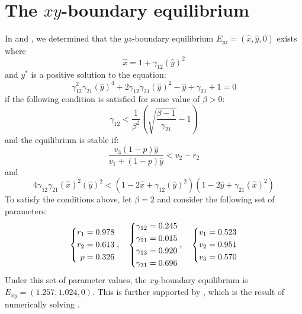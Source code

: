 \section{The $xy$-boundary equilibrium}\label{sec:numsim_xy_boundary_equilibrium}
In  and , we determined that the $yz$-boundary equilibrium $E_{yz}=\left(\hat{x},\hat{y},0\right)$ exists where
\[
\hat{x}=1+\gamma_{12}\left(\hat{y}\right)^2
\]
and $y^*$ is a positive solution to the equation:
\[
\gamma_{12}^2\gamma_{21}\left(\hat{y}\right)^4+2\gamma_{12}\gamma_{21}\left(\hat{y}\right)^2-\hat{y}+\gamma_{21}+1=0
\]
if the following condition is satisfied for some value of $\beta>0$:
\[
\gamma_{12}<\frac1{\beta^2}\left(\sqrt{\frac{\beta-1}{\gamma_{21}}}-1\right)
\]
and the equilibrium is stable if:
\[
\frac{v_3\left(1-p\right)\hat{y}}{v_1+\left(1-p\right)\hat{y}}<v_2-r_2
\]
and
\[
4\gamma_{12}\gamma_{21}\left(\hat{x}\right)^2\left(\hat{y}\right)^2<\left(1-2\hat{x}+\gamma_{12}\left(\hat{y}\right)^2\right)\left(1-2\hat{y}+\gamma_{21}\left(\hat{x}\right)^2\right)
\]
To satisfy the conditions above, let $\beta=2$ and consider the following set of parameters:
\begin{equation}
    \begin{dcases}
        \begin{aligned}
            r_1 &= 0.978\\
            r_2 &= 0.613\\
            p &= 0.326
        \end{aligned}
    \end{dcases},\quad 
    \begin{dcases}
        \begin{aligned}
            \gamma_{12} &= 0.245\\
            \gamma_{21} &= 0.015\\
            \gamma_{13} &= 0.920\\
            \gamma_{31} &= 0.696
        \end{aligned}
    \end{dcases},\quad
    \begin{dcases}
        \begin{aligned}
            v_1 &= 0.523\\
            v_2 &= 0.951\\
            v_3 &= 0.570
        \end{aligned}
    \end{dcases} 
    \label{params:6.2}
\end{equation}
Under this set of parameter values, the $xy$-boundary equilibrium is $E_{xy}=(1.257,1.024,0)$. This is further supported by , which is the result of numerically solving .

